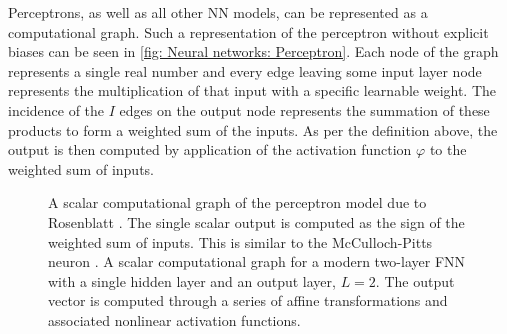 Perceptrons, as well as all other \gls{NN} models, can be represented as a computational graph. Such a representation of the perceptron without explicit biases can be seen in \autoref{fig: Neural networks: Perceptron}. Each node of the graph represents a single real number and every edge leaving some input layer node represents the multiplication of that input with a specific learnable weight. The incidence of the $I$ edges on the output node represents the summation of these products to form a weighted sum of the inputs. As per the definition above, the output is then computed by application of the activation function $\varphi$ to the weighted sum of inputs.
\begin{figure}[tbp!]
    \begin{subfigure}[b]{0.40\textwidth}
        \centering
        
        \caption{}
        \label{fig: Neural networks: Perceptron}
    \end{subfigure}
    \hfill
    \begin{subfigure}[b]{0.58\textwidth}
        \centering
        
        \caption{}
        \label{fig: Neural networks: MLP}
    \end{subfigure}
    \caption{ A scalar computational graph of the perceptron model due to Rosenblatt \cite{Rosenblatt1957}. The single scalar output is computed as the sign of the weighted sum of inputs. This is similar to the McCulloch-Pitts neuron \cite{McCulloch1943}.  A scalar computational graph for a modern two-layer \gls{FNN} with a single hidden layer and an output layer, $L=2$. The output vector is computed through a series of affine transformations and associated nonlinear activation functions.}
    \label{fig: Neural networks: Single and multilayer perceptron (FNN)}
\end{figure}

